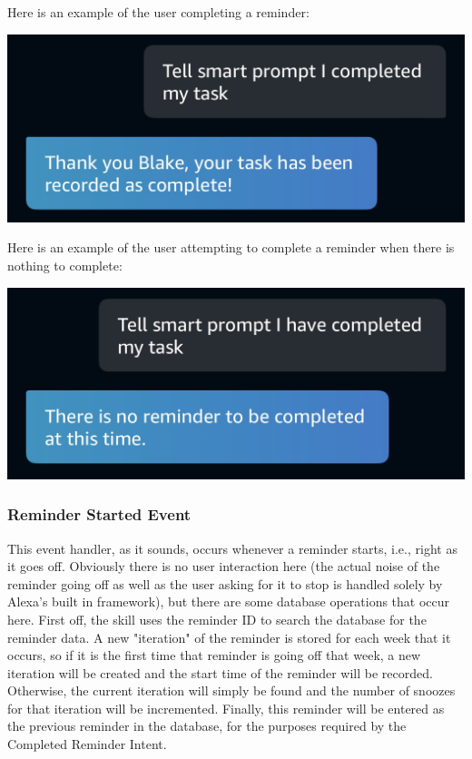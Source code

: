 \documentclass[11pt, oneside]{article}
\begin{document}
Here is an example of the user completing a reminder:
\begin{center}
  \includegraphics[width=\linewidth * 3/4]{images/completedReminder1.jpg}
\end{center}

Here is an example of the user attempting to complete a reminder when there is nothing to complete:
\begin{center}
  \includegraphics[width=\linewidth * 3/4]{images/completedReminder2.jpg}
\end{center}

\subsubsection{Reminder Started Event}

This event handler, as it sounds, occurs whenever a reminder starts, i.e., right as it goes off. 
Obviously there is no user interaction here (the actual noise of the reminder going off as well as the user asking for it to stop is handled solely by Alexa's built in framework), but there are some database operations that occur here. 
First off, the skill uses the reminder ID to search the database for the reminder data. 
A new "iteration" of the reminder is stored for each week that it occurs, so if it is the first time that reminder is going off that week, a new iteration will be created and the start time of the reminder will be recorded. 
Otherwise, the current iteration will simply be found and the number of snoozes for that iteration will be incremented. 
Finally, this reminder will be entered as the previous reminder in the database, for the purposes required by the Completed Reminder Intent. 
\end{document}
